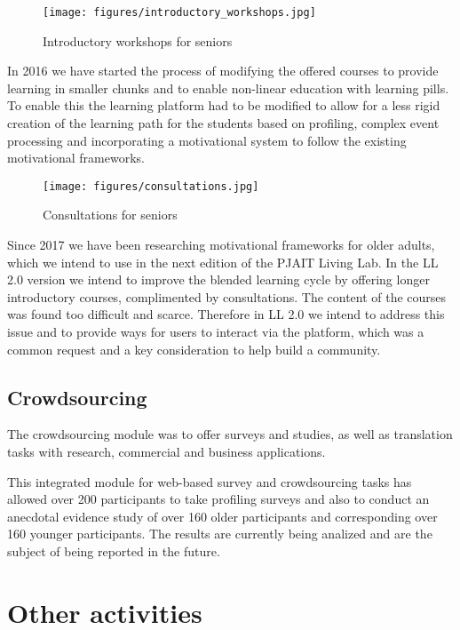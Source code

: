 \documentclass[sigconf]{acmart}
\begin{document}
\begin{figure}
\centering
\texttt{[image: figures/introductory\_workshops.jpg]}
\caption{Introductory workshops for seniors}
\label{fig:introductory}
\end{figure}

In 2016 we have started the process of modifying the offered courses to provide learning in smaller chunks and to enable non-linear education with learning pills. To enable this the learning platform had to be modified to allow for a less rigid creation of the learning path for the students based on profiling, complex event processing and incorporating a motivational system to follow the existing motivational frameworks.

\begin{figure}
\centering
\texttt{[image: figures/consultations.jpg]}
\caption{Consultations for seniors}
\label{fig:consultations}
\end{figure}

Since 2017 we have been researching motivational frameworks for older adults, which we intend to use in the next edition of the PJAIT Living Lab. In the LL 2.0 version we intend to improve the blended learning cycle by offering longer introductory courses, complimented by consultations. The content of the courses was found too difficult and scarce. Therefore in LL 2.0 we intend to address this issue and to provide ways for users to interact via the platform, which was a common request and a key consideration to help build a community.

\subsection{Crowdsourcing}

The crowdsourcing module was to offer surveys and studies, as well as translation tasks with research, commercial and business applications.

This integrated module for web-based survey and crowdsourcing tasks has allowed over 200 participants to take profiling surveys and also to conduct an anecdotal evidence study of over 160 older participants and corresponding over 160 younger participants. The results are currently being analized and are the subject of being reported in the future.

\section{Other activities}
\end{document}
